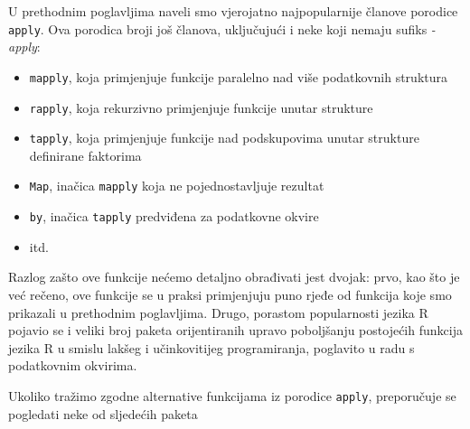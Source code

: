 \documentclass[]{book}
\providecommand{\tightlist}{%
  \setlength{\itemsep}{0pt}\setlength{\parskip}{0pt}}
\theoremstyle{definition}
\theoremstyle{definition}
\theoremstyle{definition}
\theoremstyle{remark}
\begin{document}
U prethodnim poglavljima naveli smo vjerojatno najpopularnije članove
porodice \texttt{apply}. Ova porodica broji još članova, uključujući i
neke koji nemaju sufiks \emph{-apply}:

\begin{itemize}
\tightlist
\item
  \texttt{mapply}, koja primjenjuje funkcije paralelno nad više
  podatkovnih struktura
\item
  \texttt{rapply}, koja rekurzivno primjenjuje funkcije unutar strukture
\item
  \texttt{tapply}, koja primjenjuje funkcije nad podskupovima unutar
  strukture definirane faktorima
\item
  \texttt{Map}, inačica \texttt{mapply} koja ne pojednostavljuje
  rezultat
\item
  \texttt{by}, inačica \texttt{tapply} predviđena za podatkovne okvire
\item
  itd.
\end{itemize}

Razlog zašto ove funkcije nećemo detaljno obrađivati jest dvojak: prvo,
kao što je već rečeno, ove funkcije se u praksi primjenjuju puno rjeđe
od funkcija koje smo prikazali u prethodnim poglavljima. Drugo, porastom
popularnosti jezika R pojavio se i veliki broj paketa orijentiranih
upravo poboljšanju postojećih funkcija jezika R u smislu lakšeg i
učinkovitijeg programiranja, poglavito u radu s podatkovnim okvirima.

Ukoliko tražimo zgodne alternative funkcijama iz porodice
\texttt{apply}, preporučuje se pogledati neke od sljedećih paketa
\end{document}
